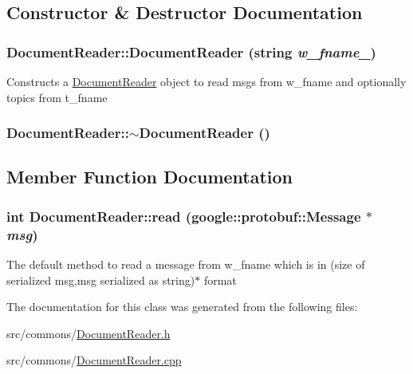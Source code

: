 \subsection{Constructor \& Destructor Documentation}
\hypertarget{class_document_reader_acd670709e278e782a5a9c79d86ebd086}{
\subsubsection[{DocumentReader}]{\setlength{\rightskip}{0pt plus 5cm}DocumentReader::DocumentReader (string {\em w\_\-fname\_\-})}}
\label{class_document_reader_acd670709e278e782a5a9c79d86ebd086}
Constructs a \hyperlink{class_document_reader}{DocumentReader} object to read msgs from w\_\-fname and optionally topics from t\_\-fname \hypertarget{class_document_reader_a7f2c184fd2e50aac424543a74373c329}{
\subsubsection[{$\sim$DocumentReader}]{\setlength{\rightskip}{0pt plus 5cm}DocumentReader::$\sim$DocumentReader ()}}
\label{class_document_reader_a7f2c184fd2e50aac424543a74373c329}


\subsection{Member Function Documentation}
\hypertarget{class_document_reader_a9a3ef697689b237ae93d4d6a1ef73797}{
\subsubsection[{read}]{\setlength{\rightskip}{0pt plus 5cm}int DocumentReader::read (google::protobuf::Message $\ast$ {\em msg})}}
\label{class_document_reader_a9a3ef697689b237ae93d4d6a1ef73797}
The default method to read a message from w\_\-fname which is in (size of serialized msg,msg serialized as string)$\ast$ format 

The documentation for this class was generated from the following files:\begin{DoxyCompactItemize}
\item 
src/commons/\hyperlink{_document_reader_8h}{DocumentReader.h}\item 
src/commons/\hyperlink{_document_reader_8cpp}{DocumentReader.cpp}\end{DoxyCompactItemize}
